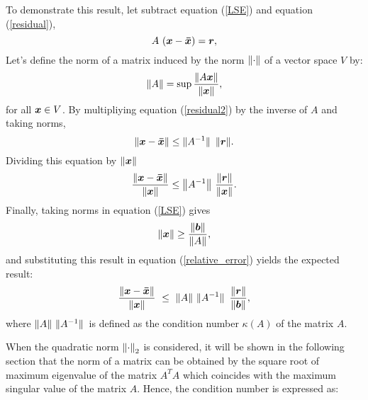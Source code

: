       To demonstrate this result, 
      let subtract equation (\ref{LSE}) and equation (\ref{residual}), 
        \begin{equation}
                 A  \ ( \boldsymbol{x} - \boldsymbol{\bar x} )  = \boldsymbol{r},
                 \label{residual2}
          \end{equation} 
     Let's define the norm of a matrix induced by the norm $ \norm{\cdot} $ of 
     a 
     vector space $ V $ by: 
       \begin{equation}
            \norm{A} =  \sup \frac{ \norm{ A \boldsymbol{x} } }{\norm{\boldsymbol{x}}},  
         \end{equation} 
      for all $ \boldsymbol{x}  \in V $. 
      By multipliying equation (\ref{residual2}) by the inverse of $ A $ and 
      taking norms,   
      \begin{equation}
       \norm{ \vect{x} - \vect{\bar x}  } \le \norm*{ A^{-1} } \ 
       \norm{\vect{r}}.
       \label{global_error}
      \end{equation} 
      Dividing this equation by $ \norm{ \boldsymbol{x} } $
      \begin{equation}
            \frac{ \norm{ \vect{x} - \vect{\bar x}  } }
                 {    \norm{\vect{x}}    }
            \le \norm{ A^{-1} } \ 
            \frac{ \norm{\vect{r}} }{ \norm{ \vect{x} } }.
            \label{relative_error}
      \end{equation}
      Finally, taking norms in equation (\ref{LSE}) gives 
      \begin{equation}
            \norm{ \boldsymbol{x}  } \ge \frac{ \norm{ \boldsymbol{b} } }{ \norm{ A } },
            \label{SUB}
       \end{equation}
      and substituting this result in equation (\ref{relative_error})  yields 
      the expected result: 
      \begin{equation}
                \frac{\norm{ \vect{x} - \vect{\bar x}  }}{\norm{ \vect{x}}} \ 
                \leq \
                     \norm{ A } \ \norm*{ A^{-1} } \
                     \frac{\norm{ \vect{r}}}{\norm{\vect{b}}}, 
                     \label{error}
           \end{equation}
  where  $   \norm{ A } \ \norm*{ A^{-1} }  $ is defined as the condition 
  number 
  $ 
  \kappa(A)$ of the matrix $ A$. 
      
     
      
 When  the quadratic norm $\norm{\cdot}_2$ is considered, it will 
 be shown in the following section that the norm of a matrix can be obtained by 
 the square root of maximum eigenvalue of the matrix $ A^T A $ which coincides 
 with the maximum singular value of the matrix $ A $. Hence, the condition 
 number is expressed as:  
 
